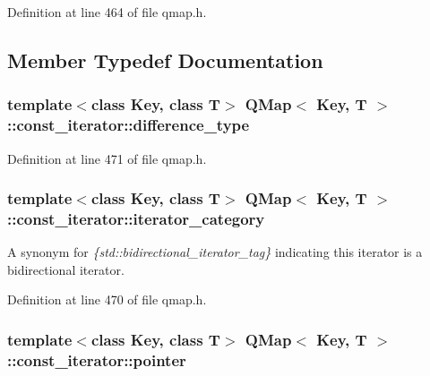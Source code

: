 Definition at line 464 of file qmap.\+h.



\subsection{Member Typedef Documentation}
\subsubsection[{\texorpdfstring{difference\+\_\+type}{difference_type}}]{\setlength{\rightskip}{0pt plus 5cm}template$<$class Key, class T$>$ {\bf Q\+Map}$<$ Key, T $>$\+::{\bf const\+\_\+iterator\+::difference\+\_\+type}}\hypertarget{class_q_map_1_1const__iterator_a7e5b2d0b217016d40d7b3577bc1f7f16}{}\label{class_q_map_1_1const__iterator_a7e5b2d0b217016d40d7b3577bc1f7f16}


Definition at line 471 of file qmap.\+h.

\subsubsection[{\texorpdfstring{iterator\+\_\+category}{iterator_category}}]{\setlength{\rightskip}{0pt plus 5cm}template$<$class Key, class T$>$ {\bf Q\+Map}$<$ Key, T $>$\+::{\bf const\+\_\+iterator\+::iterator\+\_\+category}}\hypertarget{class_q_map_1_1const__iterator_a79928cf33eb28c75816c043713618cc8}{}\label{class_q_map_1_1const__iterator_a79928cf33eb28c75816c043713618cc8}
A synonym for {\itshape \{std\+::bidirectional\+\_\+iterator\+\_\+tag\}} indicating this iterator is a bidirectional iterator. 

Definition at line 470 of file qmap.\+h.

\subsubsection[{\texorpdfstring{pointer}{pointer}}]{\setlength{\rightskip}{0pt plus 5cm}template$<$class Key, class T$>$ {\bf Q\+Map}$<$ Key, T $>$\+::{\bf const\+\_\+iterator\+::pointer}}\hypertarget{class_q_map_1_1const__iterator_abbd1b2800284c6c885a8e749639a0e61}{}\label{class_q_map_1_1const__iterator_abbd1b2800284c6c885a8e749639a0e61}


